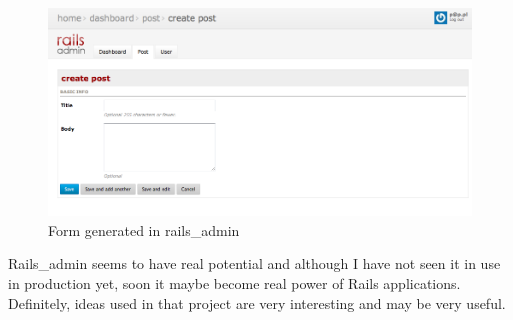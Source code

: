 	\begin{figure}[hbt!]
		\begin{center}
			\includegraphics[width=\linewidth]{images/chapter01/railsadmin2.png}
			\caption{Form generated in rails\_admin }
			\label{railsadmin2}
		\end{center}
	\end{figure}

  Rails\_admin seems to have real potential and although I have not seen it in use in production yet, soon it maybe become real power of Rails applications. Definitely, ideas used in that project are very interesting and may be very useful.